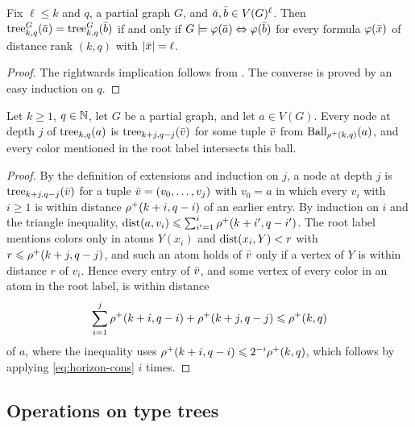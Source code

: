 \begin{corollary}\label{cor:tp-tree}
   Fix $\ell\le k$ and $q$,  a partial graph $G$, and  $\bar a,\bar b\in V(G)^\ell$. Then $\mathrm{tree}^G_{k,q}(\bar a)=\mathrm{tree}^G_{k,q}(\bar b)$ if and only if $G\models \varphi(\bar a)\Leftrightarrow \varphi(\bar b)$ for every \distFO formula $\varphi(\bar x)$  of distance rank $(k,q)$ with $|\bar x|=\ell$.
\end{corollary}
\begin{proof}
   The rightwards implication follows from . The converse is proved by an easy induction on $q$.
\end{proof}

\begin{lemma}[locality]\label{lem:locality}
Let $k\ge1$, $q\in\mathbb N$, let $G$ be a partial graph, and let $a\in V(G)$.
Every node at depth $j$ of $\mathrm{tree}_{k,q}(a)$ is $\mathrm{tree}_{k+j,q-j}(\bar v)$ for some tuple $\bar v$ from $\operatorname{Ball}_{\rho^+(k,q)}(a)$, and every color mentioned in the root label intersects this ball.
\end{lemma}
\begin{proof}
By the definition of extensions and induction on $j$, a node at depth $j$ is $\mathrm{tree}_{k+j,q-j}(\bar v)$ for a tuple $\bar v=(v_0,\ldots,v_j)$ with $v_0=a$ in which every $v_i$ with $i\ge1$ is within distance $\rho^+(k+i,q-i)$ of an earlier entry.
By induction on $i$ and the triangle inequality, $\mathrm{dist}(a,v_i)\leqslant\sum_{i'=1}^{i}\rho^+(k+i',q-i')$.
The root label mentions colors only in atoms $Y(x_i)$ and $\mathrm{dist}(x_i,Y)<r$ with $r\leqslant\rho^+(k+j,q-j)$, and such an atom holds of $\bar v$ only if a vertex of $Y$ is within distance $r$ of $v_i$.
Hence every entry of $\bar v$, and some vertex of every color in an atom in the root label, is within distance
\[
\sum_{i=1}^{j}\rho^+(k+i,q-i)+\rho^+(k+j,q-j)\leqslant\rho^+(k,q)
\]
of $a$, where the inequality uses $\rho^+(k+i,q-i)\leqslant2^{-i}\rho^+(k,q)$, which follows by applying \eqref{eq:horizon-cons} $i$ times.
\end{proof}


\subsection{Operations on type trees}

